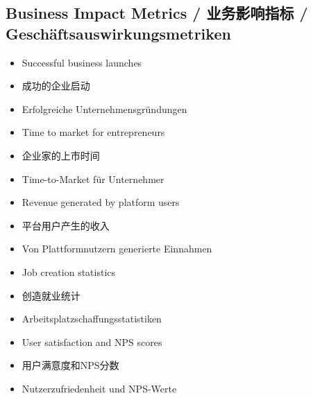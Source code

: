 \subsection{Business Impact Metrics / 业务影响指标 / Geschäftsauswirkungsmetriken}
\begin{itemize}
    \item Successful business launches
    \item 成功的企业启动
    \item Erfolgreiche Unternehmensgründungen
    \item Time to market for entrepreneurs
    \item 企业家的上市时间
    \item Time-to-Market für Unternehmer
    \item Revenue generated by platform users
    \item 平台用户产生的收入
    \item Von Plattformnutzern generierte Einnahmen
    \item Job creation statistics
    \item 创造就业统计
    \item Arbeitsplatzschaffungsstatistiken
    \item User satisfaction and NPS scores
    \item 用户满意度和NPS分数
    \item Nutzerzufriedenheit und NPS-Werte
\end{itemize}

